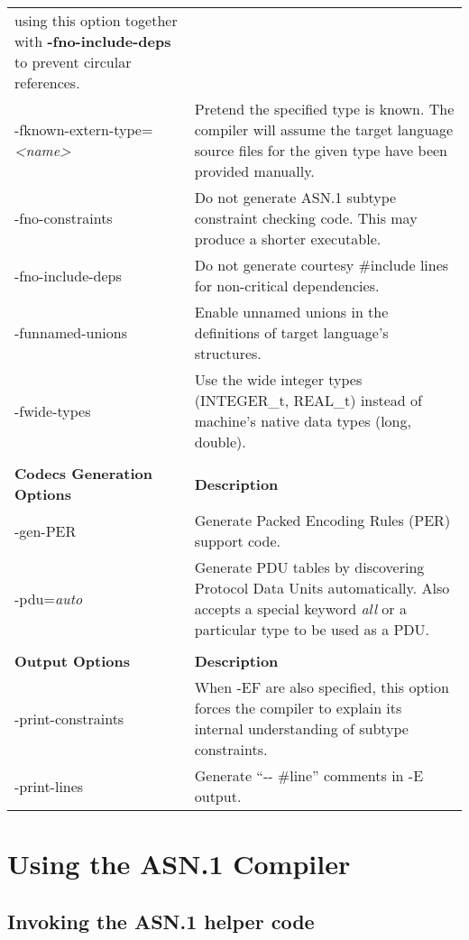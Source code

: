 \documentclass[english,oneside,12pt]{book}
\begin{document}
\begin{longtable}{lp{4in}}
{using this option together with \textbf{-fno-include-deps}
to prevent circular references. }\\
{-fknown-extern-type=}\emph{<name>} & {\small Pretend the specified type is known. The compiler will assume
the target language source files for the given type have been provided
manually. }\\
{-fno-constraints} & {\small Do not generate ASN.1 subtype constraint checking code. This
may produce a shorter executable.}\\
{-fno-include-deps} & {\small Do not generate courtesy \#include lines for non-critical
dependencies.}\\
{-funnamed-unions} & {\small Enable  unnamed  unions in the definitions of target language's structures.}\\
{-fwide-types} & {\small Use the wide integer types (INTEGER\_t, REAL\_t) instead of machine's native data types (long, double). }\\\\
\textbf{Codecs Generation Options} & \textbf{Description}\\
\midrule
{-gen-PER} & {\small Generate Packed Encoding Rules (PER) support code.}\\
{-pdu=}\emph{auto} & {\small Generate PDU tables by discovering Protocol Data Units automatically. Also accepts a special keyword \emph{all} or a particular type to be used as a PDU.}\\ \\
\textbf{Output Options} & \textbf{Description}\\
\midrule
{-print-constraints} & {\small When -EF are also specified, this option forces the compiler
to explain its internal understanding of subtype constraints.}\\
{-print-lines} & {\small Generate ``-{}- \#line'' comments
in -E output.}\\
\end{longtable}
\renewcommand{\arraystretch}{1}


\chapter{Using the ASN.1 Compiler}


\section[Invoking the helper code]{Invoking the ASN.1 helper code}
\end{document}
